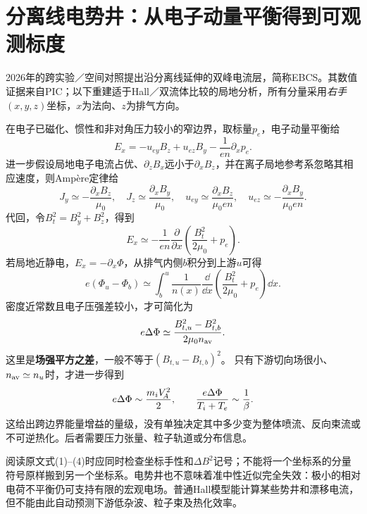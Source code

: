 \section{分离线电势井：从电子动量平衡得到可观测标度}
2026年的跨实验／空间对照提出沿分离线延伸的双峰电流层，简称EBCS。其数值证据来自PIC；以下重建适于Hall／双流体比较的局地分析，所有分量采用\emph{右手}$(x,y,z)$坐标，$x$为法向、$z$为排气方向。\citep{L312}

在电子已磁化、惯性和非对角压力较小的窄边界，取标量$p_e$，电子动量平衡给
\begin{equation}
 E_x=-u_{ey}B_z+u_{ez}B_y-\frac{1}{en}\partial_xp_e.
\end{equation}
进一步假设局地电子电流占优、$\partial_zB_x$远小于$\partial_xB_z$，并在离子局地参考系忽略其相应速度，则Ampère定律给
\begin{equation}
 J_y\simeq-\frac{\partial_xB_z}{\mu_0},\quad
 J_z\simeq\frac{\partial_xB_y}{\mu_0},\quad
 u_{ey}\simeq\frac{\partial_xB_z}{\mu_0en},\quad
 u_{ez}\simeq-\frac{\partial_xB_y}{\mu_0en}.
\end{equation}
代回，令$B_t^2=B_y^2+B_z^2$，得到
\begin{equation}
 E_x\simeq-\frac{1}{en}\frac{\partial}{\partial x}
 \left(\frac{B_t^2}{2\mu_0}+p_e\right).
\end{equation}
若局地近静电，$E_x=-\partial_x\Phi$，从排气内侧$b$积分到上游$u$可得
\begin{equation}
 e(\Phi_u-\Phi_b)
 \simeq\int_b^u\frac{1}{n(x)}\frac{\dd}{\dd x}
 \left(\frac{B_t^2}{2\mu_0}+p_e\right)\dd x.
\end{equation}
密度近常数且电子压强差较小，才可简化为
\begin{equation}
 e\Delta\Phi\simeq\frac{B_{t,u}^2-B_{t,b}^2}{2\mu_0n_{\rm av}}.
 \label{eq:separatrix_potential}
\end{equation}
这里是\textbf{场强平方之差}，一般不等于$(B_{t,u}-B_{t,b})^2$。
只有下游切向场很小、$n_{\rm av}\simeq n_u$时，才进一步得到
\begin{equation}
 e\Delta\Phi\sim\frac{m_iV_{\!A}^2}{2},\qquad
 \frac{e\Delta\Phi}{T_i+T_e}\sim\frac1\beta.
\end{equation}
这给出跨边界能量增益的量级，没有单独决定其中多少变为整体喷流、反向束流或不可逆热化。后者需要压力张量、粒子轨道或分布信息。

阅读原文式(1)--(4)时应同时检查坐标手性和$\Delta B^2$记号；不能将一个坐标系的分量符号原样搬到另一个坐标系。电势井也不意味着准中性近似完全失效：极小的相对电荷不平衡仍可支持有限的宏观电场。普通Hall模型能计算某些势井和漂移电流，但不能由此自动预测下游低杂波、粒子束及热化效率。






